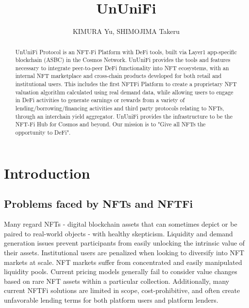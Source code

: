 \documentclass[dvipdfmx]{jsarticle}
\title{UnUniFi}
\author{KIMURA Yu, SHIMOJIMA Takeru}
\begin{document}

\maketitle

\begin{abstract}
  UnUniFi Protocol is an NFT-Fi Platform with DeFi tools, built via Layer1 app-speciﬁc blockchain (ASBC) in the Cosmos Network. 
  UnUniFi provides the tools and features necessary to integrate peer-to-peer DeFi functionality into NFT ecosystems, with an internal NFT marketplace and cross-chain products developed for both retail and institutional users. 
  This includes the ﬁrst NFTFi Platform to create a proprietary NFT valuation algorithm calculated using real demand data, while allowing users to engage in DeFi activities to generate earnings or rewards from a variety of lending/borrowing/financing activities and third party protocols relating to NFTs, through an interchain yield aggregator. 
  UnUniFi provides the infrastructure to be the NFT-Fi Hub for Cosmos and beyond. 
  Our mission is to "Give all NFTs the opportunity to DeFi".
\end{abstract}

\section{Introduction}

\subsection{Problems faced by NFTs and NFTFi}
Many regard NFTs - digital blockchain assets that can sometimes depict or be paired to real-world objects - with healthy skepticism. 
Liquidity and demand generation issues prevent participants from easily unlocking the intrinsic value of their assets. 
Institutional users are penalized when looking to diversify into NFT markets at scale. 
NFT markets suffer from concentrated and easily manipulated liquidity pools. 
Current pricing models generally fail to consider value changes based on rare NFT assets within a particular collection. 
Additionally, many current NFTFi solutions are limited in scope, cost-prohibitive, and often create unfavorable lending terms for both platform users and platform lenders.
\end{document}
